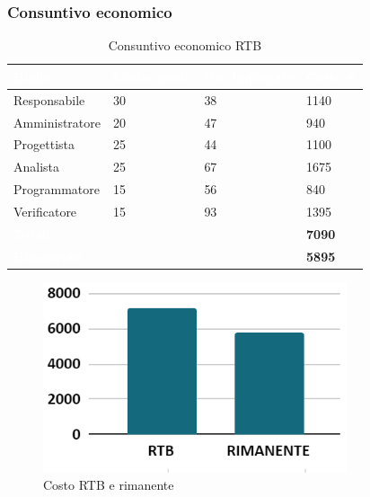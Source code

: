\newpage
\subsubsection{Consuntivo economico}
{
\setlength{\tabcolsep}{10pt}
\renewcommand{\arraystretch}{1.5}
\begin{table}[h]
    \centering
    \begin{tabularx}{\textwidth}{| l | l | l | X |}
        \hline
        \rowcolor{headerrow} \textbf{\textcolor{white}{Ruolo}} & \textbf{\textcolor{white}{Costo orario}} & \textbf{\textcolor{white}{Ore impiegate}} & \textbf{\textcolor{white}{Costo €}} \\
        \hline
        Responsabile & 30 & 38 & 1140\\
        \hline
        Amministratore & 20 & 47 & 940\\
        \hline
        Progettista & 25 & 44 & 1100\\
        \hline
        Analista & 25 & 67 & 1675\\
        \hline
        Programmatore & 15 & 56 & 840\\
        \hline
        Verificatore & 15 & 93 & 1395\\
        \hline
        \cellcolor{headerrow} \textbf{\textcolor{white}{Totale}} &  &  & \textbf{7090}\\
        \hline
        \cellcolor{headerrow} \textbf{\textcolor{white}{Rimanente}} &  &  & \textbf{5895}\\
        \hline
    \end{tabularx}
    \caption{Consuntivo economico RTB}
    \label{tab:consuntivocostiRTB}
\end{table}
}

\begin{figure}[h!]
    \centering
    \includegraphics[width=0.8\textwidth]{costiTotaliRTB.png}
    \caption{Costo RTB e rimanente}
    \label{fig:consuntivocostoRTB}
\end{figure}

